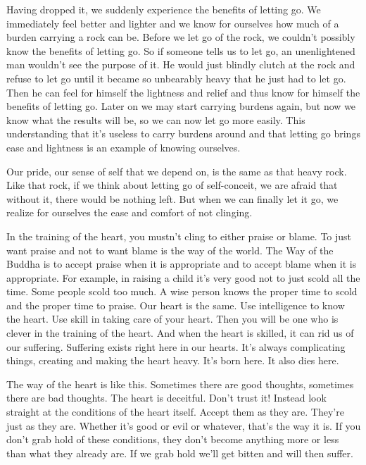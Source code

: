 Having dropped it, we suddenly experience the benefits of letting go. We immediately feel better and lighter and we know for ourselves how much of a burden carrying a rock can be. Before we let go of the rock, we couldn't possibly know the benefits of letting go. So if someone tells us to let go, an unenlightened man wouldn't see the purpose of it. He would just blindly clutch at the rock and refuse to let go until it became so unbearably heavy that he just had to let go. Then he can feel for himself the lightness and relief and thus know for himself the benefits of letting go. Later on we may start carrying burdens again, but now we know what the results will be, so we can now let go more easily. This understanding that it's useless to carry burdens around and that letting go brings ease and lightness is an example of knowing ourselves.

Our pride, our sense of self that we depend on, is the same as that heavy rock. Like that rock, if we think about letting go of self-conceit, we are afraid that without it, there would be nothing left. But when we can finally let it go, we realize for ourselves the ease and comfort of not clinging.

In the training of the heart, you mustn't cling to either praise or blame. To just want praise and not to want blame is the way of the world. The Way of the Buddha is to accept praise when it is appropriate and to accept blame when it is appropriate. For example, in raising a child it's very good not to just scold all the time. Some people scold too much. A wise person knows the proper time to scold and the proper time to praise. Our heart is the same. Use intelligence to know the heart. Use skill in taking care of your heart. Then you will be one who is clever in the training of the heart. And when the heart is skilled, it can rid us of our suffering. Suffering exists right here in our hearts. It's always complicating things, creating and making the heart heavy. It's born here. It also dies here.

The way of the heart is like this. Sometimes there are good thoughts, sometimes there are bad thoughts. The heart is deceitful. Don't trust it! Instead look straight at the conditions of the heart itself. Accept them as they are. They're just as they are. Whether it's good or evil or whatever, that's the way it is. If you don't grab hold of these conditions, they don't become anything more or less than what they already are. If we grab hold we'll get bitten and will then suffer.

